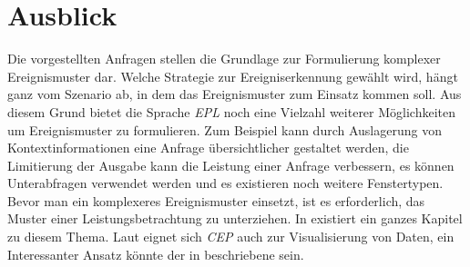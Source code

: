 \documentclass{acm_proc_article-sp}
\begin{document}
\begin{table}[ht]
    \caption{ReGex Operatoren}
    \label{table:regex}\vspace{0.2cm}
\end{table}

\section{Ausblick}
\vspace{0.1cm}
Die vorgestellten Anfragen stellen die Grundlage zur Formulierung komplexer 
Ereignismuster dar. Welche Strategie zur Ereigniserkennung gewählt wird, hängt ganz vom 
Szenario ab, in dem das Ereignismuster zum Einsatz kommen soll. Aus diesem Grund bietet 
die Sprache \textit{EPL} noch eine Vielzahl weiterer Möglichkeiten um Ereignismuster zu 
formulieren. Zum Beispiel kann durch Auslagerung von Kontextinformationen eine Anfrage 
übersichtlicher gestaltet werden, die Limitierung der Ausgabe kann die Leistung einer 
Anfrage verbessern, es können Unterabfragen verwendet werden und es existieren noch 
weitere Fenstertypen.\\
Bevor man ein komplexeres Ereignismuster einsetzt, ist es erforderlich, das Muster einer 
Leistungsbetrachtung zu unterziehen. In \cite{esper-reference} existiert ein ganzes 
Kapitel zu diesem Thema. Laut \cite{eckert} eignet sich \textit{CEP} 
auch zur Visualisierung von Daten, ein Interessanter Ansatz könnte der in \cite{perry} 
beschriebene sein.
\end{document}
